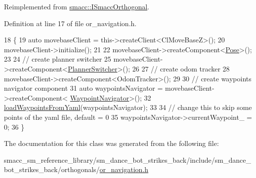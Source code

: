 Reimplemented from \hyperlink{classsmacc_1_1ISmaccOrthogonal_a6bb31c620cb64dd7b8417f8705c79c7a}{smacc\+::\+I\+Smacc\+Orthogonal}.



Definition at line 17 of file or\+\_\+navigation.\+h.


\begin{DoxyCode}
18     \{
19         \textcolor{keyword}{auto} movebaseClient = this->createClient<ClMoveBaseZ>();
20         movebaseClient->initialize();
21 
22         movebaseClient->createComponent<\hyperlink{classcl__move__base__z_1_1Pose}{Pose}>();
23 
24         \textcolor{comment}{// create planner switcher}
25         movebaseClient->createComponent<\hyperlink{classcl__move__base__z_1_1PlannerSwitcher}{PlannerSwitcher}>();
26 
27         \textcolor{comment}{// create odom tracker}
28         movebaseClient->createComponent<OdomTracker>();
29 
30         \textcolor{comment}{// create waypoints navigator component}
31         \textcolor{keyword}{auto} waypointsNavigator = movebaseClient->createComponent<
      \hyperlink{classcl__move__base__z_1_1WaypointNavigator}{WaypointNavigator}>();
32         \hyperlink{classsm__dance__bot__strikes__back_1_1OrNavigation_abd8811831075be61ad28fe4a68fc738d}{loadWaypointsFromYaml}(waypointsNavigator);
33 
34         \textcolor{comment}{// change this to skip some points of the yaml file, default = 0}
35         waypointsNavigator->currentWaypoint\_ = 0;
36     \}
\end{DoxyCode}


The documentation for this class was generated from the following file\+:\begin{DoxyCompactItemize}
\item 
smacc\+\_\+sm\+\_\+reference\+\_\+library/sm\+\_\+dance\+\_\+bot\+\_\+strikes\+\_\+back/include/sm\+\_\+dance\+\_\+bot\+\_\+strikes\+\_\+back/orthogonals/\hyperlink{sm__dance__bot__strikes__back_2include_2sm__dance__bot__strikes__back_2orthogonals_2or__navigation_8h}{or\+\_\+navigation.\+h}\end{DoxyCompactItemize}
